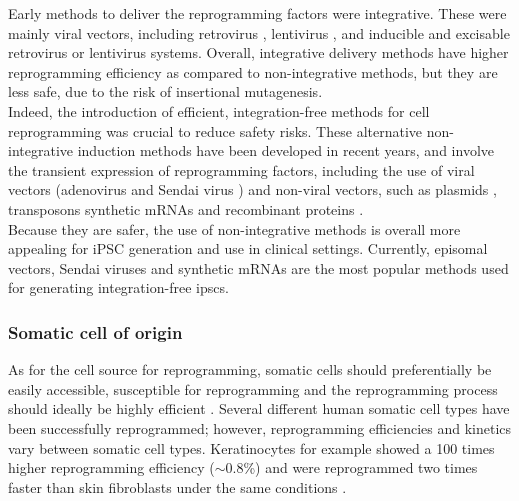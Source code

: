 Early methods to deliver the reprogramming factors were integrative.
These were mainly viral vectors, including retrovirus \cite{takahashi2006induction, takahashi2007induction, wernig2007vitro, okita2007generation, yamanaka2007strategies, maherali2007directly}, lentivirus \cite{yu2007induced, blelloch2007generation}, and 
inducible and 
excisable retrovirus \cite{soldner2009parkinson} or
lentivirus \cite{maherali2008high} systems. 
Overall, integrative delivery methods have higher reprogramming efficiency as compared to non-integrative methods, but they are less safe, due to the risk of insertional mutagenesis. \\

Indeed, the introduction of efficient, integration-free methods for cell reprogramming was crucial to reduce safety risks. 
These alternative non-integrative induction methods have been developed in recent years, and involve the transient expression of reprogramming factors, including the use of viral vectors (adenovirus \cite{stadtfeld2008reprogramming} and Sendai virus \cite{fusaki2009efficient, nishimura2011development}) and non-viral vectors, such as plasmids \cite{yu2009human, okita2008generation, okita2011more, jia2010nonviral}, transposons \cite{kaji2009virus, woltjen2009piggybac, yu2009human} synthetic mRNAs \cite{warren2010highly} and recombinant proteins \cite{kim2009generation}. \\

Because they are safer, the use of non-integrative methods is overall more appealing for iPSC generation and use in clinical settings.
Currently, episomal vectors, Sendai viruses and synthetic mRNAs are the most popular methods used for generating integration-free \glspl{ipsc}. 


\subsubsection{Somatic cell of origin}
\label{sec:ipsc_somatic_cell}

As for the cell source for reprogramming, somatic cells should preferentially be easily accessible, susceptible for reprogramming and the reprogramming process should ideally be highly efficient \cite{brouwer2016choices}. 
Several different human somatic cell types have been successfully reprogrammed; however, reprogramming efficiencies and kinetics vary between somatic cell types. 
Keratinocytes for example showed a 100 times higher reprogramming efficiency ($\sim$0.8\%) and were reprogrammed two times faster than skin fibroblasts under the same conditions \cite{aasen2008efficient}. \\

